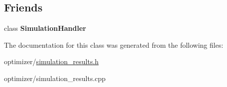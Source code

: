 \subsection*{Friends}
\begin{DoxyCompactItemize}
\item 
\mbox{\label{class_sim_results_a88881bfc7b707b9bf91fd177fefa2e04}} 
class {\bfseries Simulation\+Handler}
\end{DoxyCompactItemize}


The documentation for this class was generated from the following files\+:\begin{DoxyCompactItemize}
\item 
optimizer/\hyperlink{simulation__results_8h}{simulation\+\_\+results.\+h}\item 
optimizer/simulation\+\_\+results.\+cpp\end{DoxyCompactItemize}
